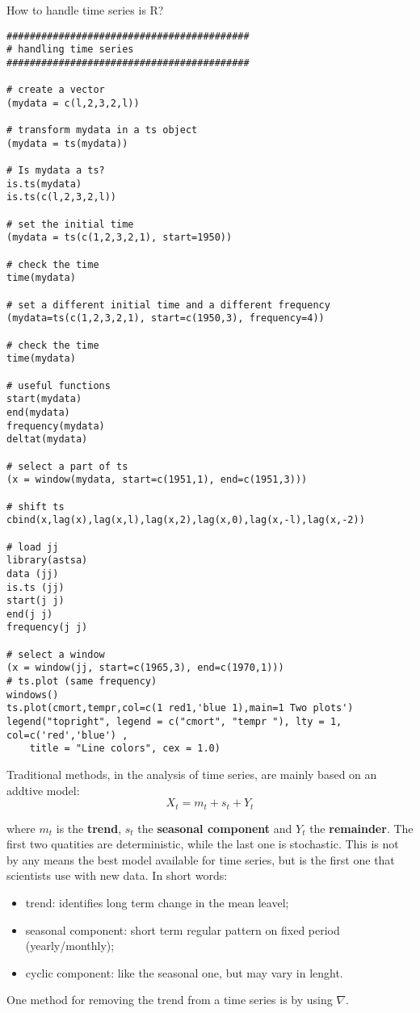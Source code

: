 How to handle time series is R?

\begin{example}
    \begin{verbatim}
##########################################
# handling time series
##########################################

# create a vector 
(mydata = c(l,2,3,2,l))

# transform mydata in a ts object 
(mydata = ts(mydata))

# Is mydata a ts? 
is.ts(mydata) 
is.ts(c(l,2,3,2,l))

# set the initial time
(mydata = ts(c(1,2,3,2,1), start=1950))

# check the time 
time(mydata)

# set a different initial time and a different frequency 
(mydata=ts(c(1,2,3,2,1), start=c(1950,3), frequency=4))

# check the time 
time(mydata)

# useful functions 
start(mydata) 
end(mydata) 
frequency(mydata) 
deltat(mydata)

# select a part of ts
(x = window(mydata, start=c(1951,1), end=c(1951,3)))

# shift ts
cbind(x,lag(x),lag(x,l),lag(x,2),lag(x,0),lag(x,-l),lag(x,-2))

# load jj 
library(astsa) 
data (jj)
is.ts (jj)
start(j j) 
end(j j)
frequency(j j)

# select a window
(x = window(jj, start=c(1965,3), end=c(1970,1)))
# ts.plot (same frequency) 
windows()
ts.plot(cmort,tempr,col=c(1 red1,'blue 1),main=1 Two plots') 
legend("topright", legend = c("cmort", "tempr "), lty = 1, col=c('red','blue') , 
    title = "Line colors", cex = 1.0)
    \end{verbatim}
\end{example}

Traditional methods, in the analysis of time series, are mainly based on an addtive model:
\[
    X_t=m_t+s_t+Y_t  
\]

where $m_t$ is the \textbf{trend}, $s_t$ the \textbf{seasonal component} and $Y_t$ the \textbf{remainder}. The first two quatities are deterministic, while the last one is stochastic. This is not by any means the best model available for time series, but is the first one that scientists use with new data. In short words:
\begin{itemize}
    \item trend: identifies long term change in the mean leavel;
    \item seasonal component: short term regular pattern on fixed period (yearly/monthly);
    \item cyclic component: like the seasonal one, but may vary in lenght.
\end{itemize}
One method for removing the trend from a time series is by using $\nabla$.

